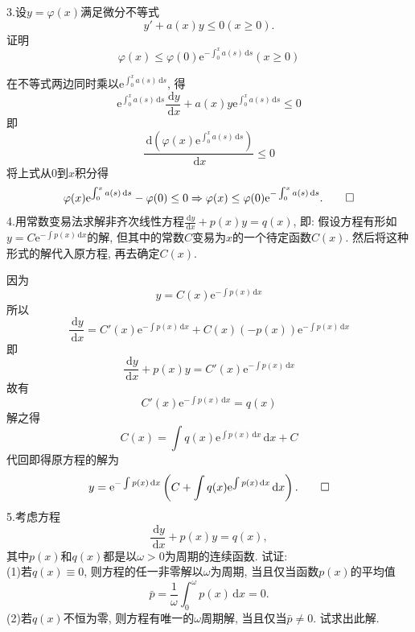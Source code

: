 \documentclass[titlepage,11pt,a4paper,twoside]{report}
\makeatletter
\newcommand\diff{\,\mathrm{d}}
\newcommand\e{\mathrm{e}}
\renewenvironment{proof}{\par
	\pushQED{\qed}%
	\normalfont \topsep1\p@\@plus6\p@\relax
	\trivlist
	\item\relax
	{\hspace*{\parindent}{\heiti 证明}\@addpunct{:}}\hspace\labelsep\ignorespaces
}{%
	\popQED\endtrivlist\@endpefalse
}
\newenvironment{solve}{\par
	\pushQED{\qed}%
	\normalfont \topsep1\p@\@plus6\p@\relax
	\trivlist
	\item\relax
	{\hspace*{\parindent}{\heiti 解}\@addpunct{:}}\hspace\labelsep\ignorespaces
}{%
	\popQED\endtrivlist\@endpefalse
}
\makeatother
\begin{document}
3.设$y=\varphi(x)$满足微分不等式
\[y'+a(x)y\leq0(x\geq0).\]
证明\[\varphi(x)\leq\varphi(0)\e^{-\int_0^xa(s)\diff s}(x\geq0)\]
\begin{proof} 
在不等式两边同时乘以$\e^{\int_0^xa(s)\diff s}$, 得
\[\e^{\int_0^xa(s)\diff s}\frac{\diff y}{\diff x}+a(x)y\e^{\int_0^xa(s)\diff s}\leq0\]
即\[\frac{\diff\left(\varphi(x)\e^{\int_0^xa(s)\diff s}\right)}{\diff x}\leq0\]
将上式从0到$x$积分得\[\varphi(x)\e^{\int_0^xa(s)\diff s}-\varphi(0)\leq0\Rightarrow\varphi(x)\leq\varphi(0)\e^{-\int_0^xa(s)\diff s}.\qedhere\]
\end{proof}
4.用常数变易法求解非齐次线性方程$\frac{\diff y}{\diff x}+p(x)y=q(x)$, 即: 假设方程有形如$y=C\e^{-\int p(x)\diff x}$的解, 但其中的常数$C$变易为$x$的一个待定函数$C(x)$. 然后将这种形式的解代入原方程, 再去确定$C(x)$.
\begin{solve}
因为\[y=C(x)\e^{-\int p(x)\diff x}\]
所以\[\frac{\diff y}{\diff x}=C'(x)\e^{-\int p(x)\diff x}+C(x)(-p(x))\e^{-\int p(x)\diff x}\]
即\[\frac{\diff y}{\diff x}+p(x)y=C'(x)\e^{-\int p(x)\diff x}\]
故有
\[C'(x)\e^{-\int p(x)\diff x}=q(x)\]
解之得\[C(x)=\int q(x)\e^{\int p(x)\diff x}\diff x+C\]
代回即得原方程的解为\[y=\e^{-\int p(x)\diff x}\left(C+\int q(x)\e^{\int p(x)\diff x}\diff x\right).\qedhere\]
\end{solve}
5.考虑方程
\[\frac{\diff y}{\diff x}+p(x)y=q(x),\]
其中$p(x)$和$q(x)$都是以$\omega>0$为周期的连续函数. 试证:\\
(1)若$q(x)\equiv0$, 则方程的任一非零解以$\omega$为周期, 当且仅当函数$p(x)$的平均值
\[\bar{p}=\frac{1}{\omega}\int_0^{\omega}p(x)\diff x=0.\]
(2)若$q(x)$不恒为零, 则方程有唯一的$\omega$周期解, 当且仅当$\bar{p}\neq0$. 试求出此解.
\end{document}
